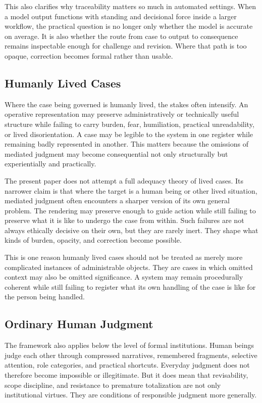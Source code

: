 \documentclass[11pt]{article}
\begin{document}
This also clarifies why traceability matters so much in automated settings. When a model output functions with standing and decisional force inside a larger workflow, the practical question is no longer only whether the model is accurate on average. It is also whether the route from case to output to consequence remains inspectable enough for challenge and revision. Where that path is too opaque, correction becomes formal rather than usable.

\subsection{Humanly Lived Cases}

Where the case being governed is humanly lived, the stakes often intensify. An operative representation may preserve administratively or technically useful structure while failing to carry burden, fear, humiliation, practical unreadability, or lived disorientation. A case may be legible to the system in one register while remaining badly represented in another. This matters because the omissions of mediated judgment may become consequential not only structurally but experientially and practically.

The present paper does not attempt a full adequacy theory of lived cases. Its narrower claim is that where the target is a human being or other lived situation, mediated judgment often encounters a sharper version of its own general problem. The rendering may preserve enough to guide action while still failing to preserve what it is like to undergo the case from within. Such failures are not always ethically decisive on their own, but they are rarely inert. They shape what kinds of burden, opacity, and correction become possible.\cite{Fricker2007EpistemicInjustice,Haraway1988SituatedKnowledges,Hacking1995LoopingEffects}

This is one reason humanly lived cases should not be treated as merely more complicated instances of administrable objects. They are cases in which omitted context may also be omitted significance. A system may remain procedurally coherent while still failing to register what its own handling of the case is like for the person being handled.

\subsection{Ordinary Human Judgment}

The framework also applies below the level of formal institutions. Human beings judge each other through compressed narratives, remembered fragments, selective attention, role categories, and practical shortcuts. Everyday judgment does not therefore become impossible or illegitimate. But it does mean that revisability, scope discipline, and resistance to premature totalization are not only institutional virtues. They are conditions of responsible judgment more generally.
\end{document}

